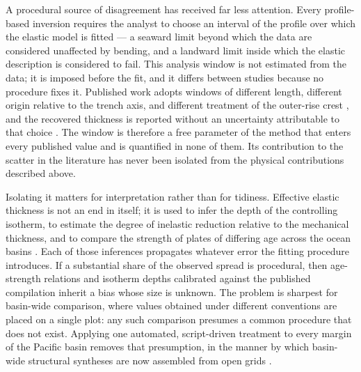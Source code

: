 \documentclass[final]{agujournal2019}
\begin{document}
A procedural source of disagreement has received far less attention. Every
profile-based inversion requires the analyst to choose an interval of the
profile over which the elastic model is fitted --- a seaward limit beyond which
the data are considered unaffected by bending, and a landward limit inside which
the elastic description is considered to fail. This analysis window is not
estimated from the data; it is imposed before the fit, and it differs between
studies because no procedure fixes it. Published work adopts windows of
different length, different origin relative to the trench axis, and different
treatment of the outer-rise crest \cite{Manriquez2014,Tandon2000}, and the
recovered thickness is reported without an uncertainty attributable to that
choice \cite{ContrerasReyesOsses2010}. The window is therefore a free parameter
of the method that enters every published value and is quantified in none of
them. Its contribution to the scatter in the literature has never been isolated
from the physical contributions described above.

Isolating it matters for interpretation rather than for tidiness. Effective
elastic thickness is not an end in itself; it is used to infer the depth of the
controlling isotherm, to estimate the degree of inelastic reduction relative to
the mechanical thickness, and to compare the strength of plates of differing
age across the ocean basins \cite{DiGiuseppe2009,CalmantCazenave1987}. Each of
those inferences propagates whatever error the fitting procedure introduces. If
a substantial share of the observed spread is procedural, then age-strength
relations and isotherm depths calibrated against the published compilation
inherit a bias whose size is unknown. The problem is sharpest for basin-wide
comparison, where values obtained under different conventions are placed on a
single plot: any such comparison presumes a common procedure that does not
exist. Applying one automated, script-driven treatment to every margin of the
Pacific basin removes that presumption, in the manner by which basin-wide
structural syntheses are now assembled from open grids
\cite{Wessel2019,Bird2003,Piskarev2019Book,Lemenkova202213,Muller2017,Sandwell2014}.
\end{document}
